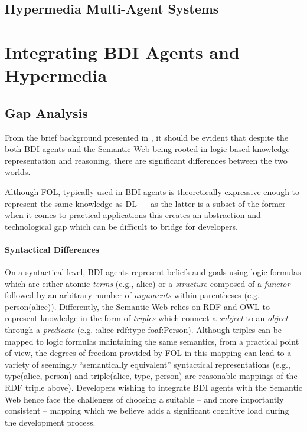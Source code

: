 \documentclass[
]{ceurart}
\begin{document}

\subsection{Hypermedia Multi-Agent Systems}


\section{Integrating \acs{BDI} Agents and Hypermedia}
\label{sec:integrating-bdi-hypermedia}

\subsection{Gap Analysis}

From the brief background presented in , 
it should be evident that
despite the both \ac{BDI} agents and the Semantic Web being rooted in logic-based knowledge representation and reasoning,
there are significant differences between the two worlds.

Although \ac{FOL}, typically used in \ac{BDI} agents is theoretically expressive enough to represent the same knowledge as \ac{DL}~\missingref{} 
-- as the latter is a subset of the former --
when it comes to practical applications this creates an abstraction and technological gap
which can be difficult to bridge for developers.

\paragraph{Syntactical Differences}

On a syntactical level, \ac{BDI} agents represent beliefs and goals using logic formulas which are either atomic \emph{terms} (e.g., \textsf{alice}) or a \emph{structure} composed of a \emph{functor} followed by an arbitrary number of \emph{arguments} within parentheses (e.g. \textsf{person(alice)}).
%
Differently, the Semantic Web relies on \ac{RDF} and \ac{OWL} to represent knowledge in the form of \emph{triples} which connect a \emph{subject} to an \emph{object} through a \emph{predicate} (e.g. \textsf{:alice rdf:type foaf:Person}).
%
Although triples can be mapped to logic formulas maintaining the same semantics, from a practical point of view, the degrees of freedom provided by \ac{FOL} in this mapping can lead to a variety of seemingly ``semantically equivalent'' syntactical representations (e.g., \textsf{type(alice, person)} and \textsf{triple(alice, type, person)} are reasonable mappings of the \ac{RDF} triple above).
%
Developers wishing to integrate \ac{BDI} agents with the Semantic Web hence face the challenges of choosing a suitable -- and more importantly consistent -- mapping which we believe adds a significant cognitive load during the development process.
\end{document}
